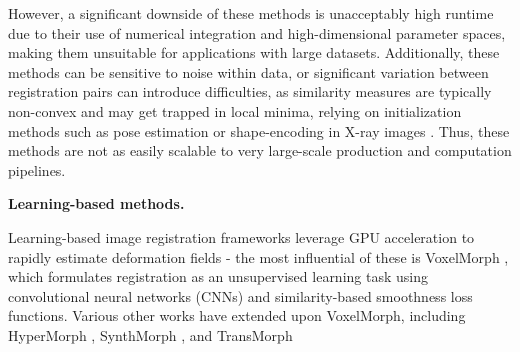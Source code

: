 \documentclass[lettersize,journal]{IEEEtran}
\begin{document}
However, a significant downside of these methods is unacceptably high runtime due to their use of numerical integration and high-dimensional parameter spaces, making them unsuitable for applications with large datasets. Additionally, these methods can be sensitive to noise within data, or significant variation between registration pairs can introduce difficulties, as similarity measures are typically non-convex and may get trapped in local minima, relying on initialization methods such as pose estimation \cite{VARNAVAS2015108} or shape-encoding in X-ray images \cite{Miao2013}. Thus, these methods are not as easily scalable to very large-scale production and computation pipelines.

\textbf{Learning-based methods.}

Learning-based image registration frameworks leverage GPU acceleration to rapidly estimate deformation fields - the most influential of these is VoxelMorph \cite{VoxelMorph2019}, which formulates registration as an unsupervised learning task using convolutional neural networks (CNNs) and similarity-based smoothness loss functions. Various other works have extended upon VoxelMorph, including HyperMorph \cite{Hoopes2021HyperMorph}, SynthMorph \cite{hoffmann2022synthmorph}, and TransMorph \cite{CHEN2022102615}

\end{document}
